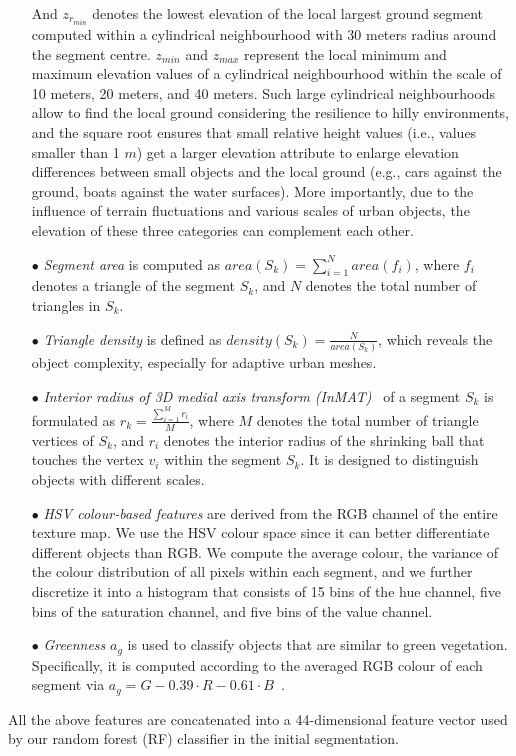 \begin{itemize}
	And $z_{r_{min}}$ denotes the lowest elevation of the local largest ground segment computed within a cylindrical neighbourhood with 30 meters radius around the segment centre.
	$z_{min}$ and $z_{max}$ represent the local minimum and maximum elevation values of a cylindrical neighbourhood within the scale of 10 meters, 20 meters, and 40 meters.
	Such large cylindrical neighbourhoods allow to find the local ground considering the resilience to hilly environments, \textcolor{ao}{and the square root ensures that small relative height values (i.e., values smaller than 1 $ m $) get a larger elevation attribute to enlarge elevation differences between small objects and the local ground (e.g., cars against the ground, boats against the water surfaces).}
	More importantly, due to the influence of terrain fluctuations and various scales of urban objects, the elevation of these three categories can complement each other.
	\item[$\bullet$] \textit{Segment area} is computed as $area(S_k) = \sum_{i = 1}^{N} area(f_i) $, where $f_i$ denotes a triangle of the segment $S_k$, and $N$ denotes the total number of triangles in $S_k$.
	\item[$\bullet$] \textit{Triangle density} is defined as $density(S_k) = \frac{N}{area(S_k)} $,  which reveals the object complexity, especially for adaptive urban meshes.
	\item[$\bullet$] \textit{Interior radius of 3D medial axis transform (InMAT)}~\citep{ma20123d,peters2016robust} of a segment $S_k$ is formulated as $r_k = \frac{\sum_{i=1}^{M} r_i}{M}$, where $M$ denotes the total number of triangle vertices of $S_k$, and $r_i$ denotes the interior radius of the shrinking ball that touches the vertex $v_i$ within the segment $S_k$. 
	It is designed to distinguish objects with different scales. 
	\item[$\bullet$] \textit{HSV colour-based features} are derived from the RGB channel of the entire texture map.
	We use the HSV colour space since it can better differentiate different objects than RGB.
	We compute the average colour, the variance of the colour distribution of all pixels within each segment, and we further discretize it into a histogram that consists of 15 bins of the hue channel, five bins of the saturation channel, and five bins of the value channel.
	\item[$\bullet$] \textit{Greenness} $a_{g}$ is used to classify objects that are similar to green vegetation.
	Specifically, it is computed according to the averaged RGB colour of each segment via $a_{g}=G-0.39\cdot R-0.61\cdot B$~\citep{mckinnon2017comparing}. 
\end{itemize}
	All the above features are concatenated into a 44-dimensional feature vector used by our random forest (RF) classifier in the initial segmentation. 

